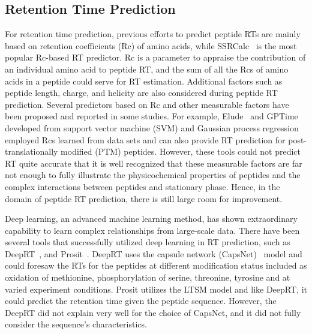 \subsection{Retention Time Prediction}
For retention time prediction, previous efforts to predict peptide RTs are mainly based on retention coefficients (Rc) of amino acids,
while SSRCalc~\cite{guo1986prediction} is the most popular Rc-based RT predictor. Rc is a parameter to appraise the contribution of an individual amino acid to peptide RT, and the sum of all the Rcs of amino acids in a peptide could serve for RT estimation.
Additional factors such as peptide length, charge, and helicity are also considered during peptide RT prediction.
Several predictors based on Rc and other measurable factors have been proposed and reported in some studies. For example, Elude~\cite{moruz2010training,moruz2012chromatographic} and GPTime~\cite{maboudi2017uncertainty} developed from support vector machine (SVM) and Gaussian process
regression employed Rcs learned from data sets and can also provide RT prediction for post-translationally modiﬁed (PTM) peptides. However, these tools could not predict RT quite accurate that it is well recognized
that these measurable factors are far not enough to fully illustrate the physicochemical properties of peptides and the complex interactions between peptides and stationary phase. Hence, in the domain of peptide RT prediction, there is still large room for improvement.

Deep learning, an advanced machine learning method, has shown extraordinary capability to learn complex relationships from large-scale data. There have been several tools that successfully utilized deep learning in RT prediction, such as DeepRT~\cite{ma2018improved}, and Prosit~\cite{gessulat2019prosit}. DeepRT uses the capsule network (CapsNet)~\cite{sabour2017dynamic} model and could foresaw the RTs for the peptides at different modification status included as oxidation of methionine, phosphorylation of
serine, threonine, tyrosine and at varied experiment conditions.
Prosit utilizes the LTSM model and like DeepRT, it could predict the retention time given the peptide sequence. However, the DeepRT did not explain very well for the choice of CapsNet, and it did not fully consider the sequence's characteristics. 

